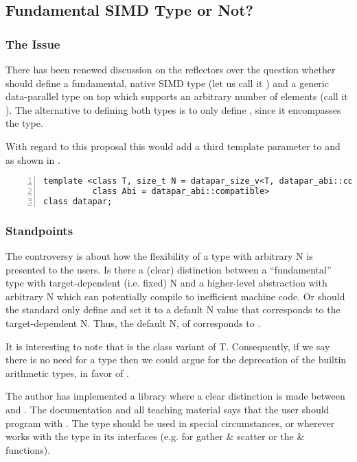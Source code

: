\subsection{Fundamental SIMD Type or Not?}
\subsubsection{The Issue}
There has been renewed discussion on the reflectors over the question whether \CC{} should define a fundamental, native SIMD type (let us call it ) and a generic data-parallel type on top which supports an arbitrary number of elements (call it ).
The alternative to defining both types is to only define , since it encompasses the  type.

With regard to this proposal this would add a third template parameter to \datapar and \mask as shown in .
\begin{lstlisting}[style=Vc,numbers=left,float,label=lst:datapar N,caption={
  Possible declaration of the class template parameters of a generic (i.e. \type{arbitrary}) \datapar class.
}]
template <class T, size_t N = datapar_size_v<T, datapar_abi::compatible>,
          class Abi = datapar_abi::compatible>
class datapar;
\end{lstlisting}

\subsubsection{Standpoints}
The controversy is about how the flexibility of a type with arbitrary \code N is presented to the users.
Is there a (clear) distinction between a “fundamental” type with target-dependent (i.e. fixed) \code N and a higher-level abstraction with arbitrary \code N which can potentially compile to inefficient machine code.
Or should the \CC{} standard only define  and set it to a default \code N value that corresponds to the target-dependent \code N.
Thus, the default \code N, of  corresponds to .

It is interesting to note that  is the class variant of \type T.
Consequently, if we say there is no need for a  type then we could argue for the deprecation of the builtin arithmetic types, in favor of . 

The author has implemented a library where a clear distinction is made between  and .
The documentation and all teaching material says that the user should program with .
The  type should be used in special circumstances, or wherever  works with the  type in its interfaces (e.g. for gather \& scatter or the  \&  functions).

